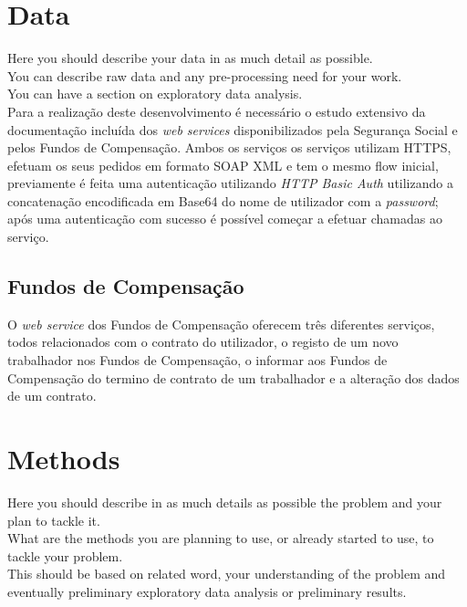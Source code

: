 \documentclass[sigplan]{acmart}
\begin{document}
\section{Data} \label{sec:data}

Here you should describe your data in as much detail as possible. \\ 

You can describe raw data and any pre-processing need for your work. \\

You can have a section on exploratory data analysis. \\

Para a realização deste desenvolvimento é necessário o estudo extensivo da documentação incluída dos \textit{web services} disponibilizados pela Segurança Social e pelos Fundos de Compensação. Ambos os serviços os serviços utilizam HTTPS, efetuam os seus pedidos em formato SOAP XML e tem o mesmo flow inicial, previamente é feita uma autenticação utilizando \textit{HTTP Basic Auth} utilizando a concatenação encodificada em Base64 do nome de utilizador com a \textit{password}; após uma autenticação com sucesso é possível começar a efetuar chamadas ao serviço.

\subsection{Fundos de Compensação}

O \textit{web service} dos Fundos de Compensação oferecem três diferentes serviços, todos relacionados com o contrato do utilizador, o registo de um novo trabalhador nos Fundos de Compensação, o informar aos Fundos de Compensação do termino de contrato de um trabalhador e a alteração dos dados de um contrato. 

\section{Methods} \label{sec:methods}

Here you should describe in as much details as possible the problem and your plan to tackle it. \\

What are the methods you are planning to use, or already started to use, to tackle your problem. \\

This should be based on related word, your understanding of the problem and eventually preliminary exploratory data analysis or preliminary results.
\end{document}
